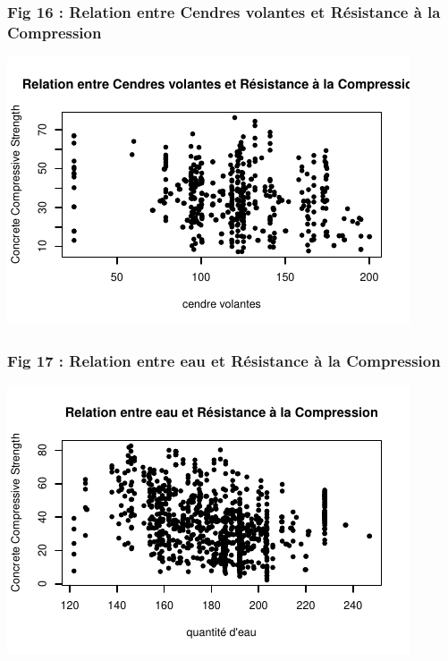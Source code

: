 \documentclass[
  12pt,
]{article}
\begin{document}
\subsubsection{Fig 16 : Relation entre Cendres volantes et Résistance à
la
Compression}\label{fig-16-relation-entre-cendres-volantes-et-ruxe9sistance-uxe0-la-compression}

\begin{center}\includegraphics{rmd_final_files/figure-latex/unnamed-chunk-36-1} \end{center}

\subsubsection{Fig 17 : Relation entre eau et Résistance à la
Compression}\label{fig-17-relation-entre-eau-et-ruxe9sistance-uxe0-la-compression}

\begin{center}\includegraphics{rmd_final_files/figure-latex/unnamed-chunk-37-1} \end{center}
\end{document}
